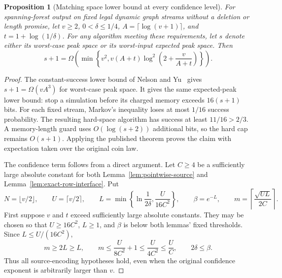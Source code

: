 \documentclass[11pt,letterpaper]{article}
\newtheorem{proposition}[theorem]{Proposition}
\numberwithin{equation}{section}
\begin{document}
\begin{proposition}[Matching space lower bound at every confidence level]
\label{prop:direct-unrestricted}
For spanning-forest output on fixed legal dynamic graph streams without a deletion or length promise, let $v\ge2$, $0<\delta\le1/4$, $A=\lceil\log(v+1)\rceil$, and $t=1+\log(1/\delta)$.
For any algorithm meeting these requirements, let $s$ denote either its worst-case peak space or its worst-input expected peak space.
Then
\begin{equation}
s+1=\Omega\!\left(\min\left\{v^2,
 v(A+t)\log^2\left(2+\frac v{A+t}\right)\right\}\right).
 \label{eq:du1}
\end{equation}
\end{proposition}
\begin{proof}
The constant-success lower bound of Nelson and Yu~\cite{NelsonYu2019} gives $s+1=\Omega(vA^3)$ for worst-case peak space.
It gives the same expected-peak lower bound: stop a simulation before its charged memory exceeds $16(s+1)$ bits.
For each fixed stream, Markov's inequality loses at most $1/16$ success probability.
The resulting hard-space algorithm has success at least $11/16>2/3$.
A memory-length guard uses $O(\log(s+2))$ additional bits, so the hard cap remains $O(s+1)$.
Applying the published theorem proves the claim with expectation taken over the original coin law.

The confidence term follows from a direct argument.
Let $C\ge4$ be a sufficiently large absolute constant for both Lemma~\ref{lem:pointwise-source} and Lemma~\ref{lem:exact-row-interface}.
Put
\begin{equation}
N=\lfloor v/2\rfloor,\qquad U=\lceil v/2\rceil,\qquad
 L=\min\left\{\ln\frac1{2\delta},\frac{U}{16C^2}\right\},
 \qquad \beta=e^{-L},\qquad
 m=\left\lceil\frac{\sqrt{UL}}{2C}\right\rceil.
 \label{eq:du2}
\end{equation}
First suppose $v$ and $t$ exceed sufficiently large absolute constants.
They may be chosen so that $U\ge16C^2$, $L\ge1$, and $\beta$ is below both lemmas' fixed thresholds.
Since $L\le U/(16C^2)$,
\begin{equation}
m\ge2L\ge L,\qquad
 m\le\frac{U}{8C^2}+1\le\frac{U}{4C^2}\le\frac UC,
 \qquad 2\delta\le\beta.
 \label{eq:du3}
\end{equation}
Thus all source-encoding hypotheses hold, even when the original confidence exponent is arbitrarily larger than $v$.


\end{proof}
\end{document}

